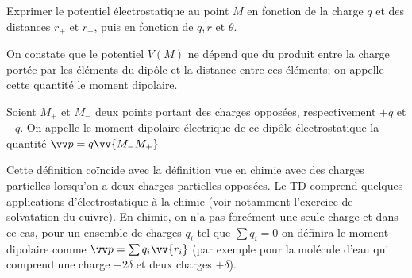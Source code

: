 \documentclass[11pt,fleqn]{book} %
\begin{document}
\begin{capex}
Exprimer le potentiel électrostatique au point $M$ en fonction de la charge $q$ et des distances $r_+$ et $r_-$, puis en fonction de $q,r$ et $\theta$.
\end{capex}


On constate que le potentiel $V(M)$ ne dépend que du produit entre la charge portée par les éléments du dipôle et la distance entre ces éléments; on appelle cette quantité le moment dipolaire.


\begin{definition}
    Soient $M_+$ et $M_-$ deux points portant des charges opposées, respectivement $+q$ et $-q$. On appelle le moment dipolaire électrique de ce dipôle électrostatique la quantité $\vv p = q \vv{M_- M_+}$
\end{definition}

\begin{remark}
    Cette définition coïncide avec la définition vue en chimie avec des charges partielles lorsqu'on a deux charges partielles opposées. Le TD comprend quelques applications d'électrostatique à la chimie (voir notamment l'exercice de solvatation du cuivre). En chimie, on n'a pas forcément une seule charge et dans ce cas, pour un ensemble de charges $q_i$ tel que $\sum q_i = 0$ on définira le moment dipolaire comme $\vv p = \sum q_i \vv{r_i}$ (par exemple pour la molécule d'eau qui comprend une charge $-2\delta$ et deux charges $+\delta$).
\end{remark}
\end{document}
